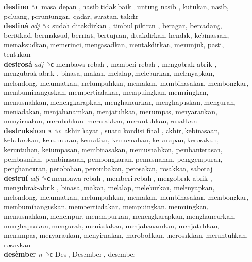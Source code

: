 \textbf{destino} ␝ϲ   masa depan ,  nasib tidak baik ,  untung nasib , kutukan, nasib, peluang, peruntungan, qadar, suratan, takdir  \\
\textbf{destiná} \emph{adj}  ␝ϲ   sudah ditakdirkan ,  timbul pikiran , beragan, bercadang, beritikad, bermaksud, berniat, bertujuan, ditakdirkan, hendak, kebinasaan, memaksudkan, memerinci, mengasadkan, mentakdirkan, menunjuk, pasti, tentukan  \\
\textbf{destrosá} \emph{adj}  ␝ϲ   membawa rebah ,  memberi rebah ,  mengobrak-abrik ,  mengubrak-abrik , binasa, makan, melalap, meleburkan, melenyapkan, melondong, melumatkan, melumpuhkan, memakan, membinasakan, membongkar, membumihanguskan, mempertiadakan, mempuingkan, memuingkan, memusnahkan, menengkarapkan, menghancurkan, menghapuskan, mengurah, meniadakan, menjahanamkan, menjatuhkan, menumpas, menyaraukan, menyirnakan, merobohkan, merosakkan, meruntuhkan, rosakkan  \\
\textbf{destrukshon} \emph{n}  ␝ϲ   akhir hayat ,  suatu kondisi final , akhir, kebinasaan, kebobrokan, kehancuran, kematian, kemusnahan, keranapan, kerosakan, keruntuhan, ketumpasan, membinasakan, memusnahkan, pembanterasan, pembasmian, pembinasaan, pembongkaran, pemusnahan, penggempuran, penghancuran, perobohan, perombakan, perosakan, rosakkan, sabotaj  \\
\textbf{destruí} \emph{adj}  ␝ϲ   membawa rebah ,  memberi rebah ,  mengobrak-abrik ,  mengubrak-abrik , binasa, makan, melalap, meleburkan, melenyapkan, melondong, melumatkan, melumpuhkan, memakan, membinasakan, membongkar, membumihanguskan, mempertiadakan, mempuingkan, memuingkan, memusnahkan, menempur, menempurkan, menengkarapkan, menghancurkan, menghapuskan, mengurah, meniadakan, menjahanamkan, menjatuhkan, menumpas, menyaraukan, menyirnakan, merobohkan, merosakkan, meruntuhkan, rosakkan  \\
\textbf{desèmber} \emph{n}  ␝ϲ   Des ,  Desember , desember  \\
